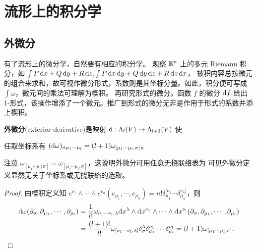 \chapter{流形上的积分学}\label{appx:form}

\section{外微分}
有了流形上的微分学，自然要有相应的积分学。
观察 $\mathbb{R}^n$ 上的多元 Riemann 积分，如 $\int P\,\dd x+Q\,\dd y+R\,\dd z,\int P\,\dd x\,\dd y+Q\,\dd y\,\dd z+R\,\dd z\,\dd x$，
被积内容总按微元的组合来求和，故可视作微分形式，系数则是其坐标分量。如此，积分便可写成 $\int \omega$，微元间的乘法可理解为楔积。
再研究形式的微分。函数 $f$ 的微分 $\dd f$ 给出 1-形式，该操作增添了一个微元。推广到形式的微分无非是作用于形式的系数并添上楔积。
\begin{definition}
    \textbf{外微分}(exterior derivative)是映射 $\dd:\Lambda_l(V)\to\Lambda_{l+1}(V)$ 使
\end{definition}

\begin{theorem}
    任取坐标系有 $(\dd\omega)_{\sigma\mu_1\cdots\mu_l}=(l+1)\omega_{[\mu_1\cdots\mu_l,\sigma]}$。
\end{theorem}

\begin{remark}
    注意 $\omega_{[\mu_1\cdots\mu_l;\sigma]}=\omega_{[\mu_1\cdots\mu_l,\sigma]}$，这说明外微分可用任意无挠联络表为
    可见外微分定义显然无关于坐标系或无挠联络的选取。
\end{remark}

\begin{proof}由楔积定义知 $e^{\nu_1}\wedge\cdots\wedge e^{\nu_n}(e_{\mu_1},\cdots,e_{\mu_n})=n!\delta_{\mu_1}^{[\nu_1}\cdots\delta_{\mu_n}^{\nu_n]}$，则
    \begin{align*}
        \dd\omega(\partial_{\sigma},\partial_{\mu_1},\cdots,\partial_{\mu_l})&=\frac{1}{l!}\omega_{\nu_1\cdots\nu_l,\lambda}\dd x^\lambda\wedge\dd x^{\nu_{1}}\wedge\cdots\wedge\dd x^{\nu_{l}}(\partial_{\sigma},\partial_{\mu_1},\cdots,\partial_{\mu_l})\\
        &=\frac{(l+1)!}{l!} \omega_{[\nu_1\cdots\nu_l,\lambda]} \delta_{\sigma}^{\lambda}\delta_{\mu_1}^{\nu_1}\cdots\delta_{\mu_l}^{\nu_l}=(l+1)\omega_{[\mu_1\cdots\mu_l,\sigma]}.\qedhere
    \end{align*}
\end{proof}

